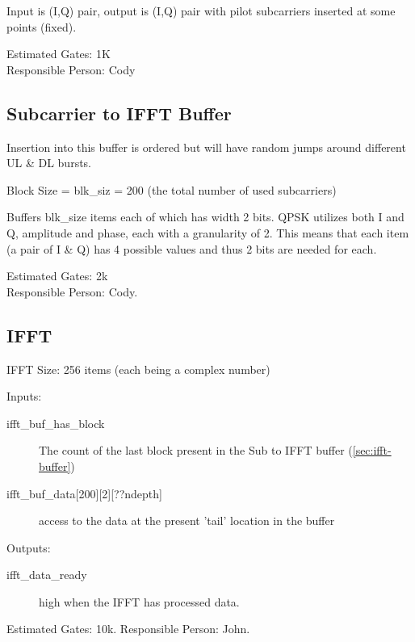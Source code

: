 \documentclass[dvips,10pt,twocolumn]{article}
\begin{document}
		Input is (I,Q) pair, output is (I,Q) pair with pilot subcarriers
		inserted at some points (fixed).

		Estimated Gates: 1K \\
		Responsible Person: Cody

	\subsection{Subcarrier to IFFT Buffer}
		\label{sec:ifft-buffer}
		Insertion into this buffer is ordered but will have random
		jumps around different UL \& DL bursts.

		Block Size = blk\_siz = 200 (the total number of used
		subcarriers)
		
		Buffers blk\_size items each of which has width 2 bits.
		QPSK utilizes both I and Q, amplitude and phase, each with
		a granularity of 2. This means that each item (a pair of I
		\& Q) has 4 possible values and thus 2 bits are needed for
		each.

		Estimated Gates: 2k \\
		Responsible Person: Cody.

	\subsection{IFFT}
	\label{sec:ifft}
	IFFT Size: 256 items (each being a complex number)
	\begin{description}
		\item{Inputs:}
		\begin{description}
			\item[ifft\_buf\_has\_block] The count of the last
				block present in the Sub to IFFT buffer
				(\autoref{sec:ifft-buffer})
			
			\item[ifft\_buf\_data{[200][2][??ndepth]}] access
				to the data at the present 'tail' location
				in the buffer
		\end{description}
		
		\item{Outputs:}
		\begin{description}
			\item[ifft\_data\_ready] high when the IFFT has
				processed data.
		\end{description}
	\end{description}

	Estimated Gates: 10k.
	Responsible Person: John.
\end{document}
